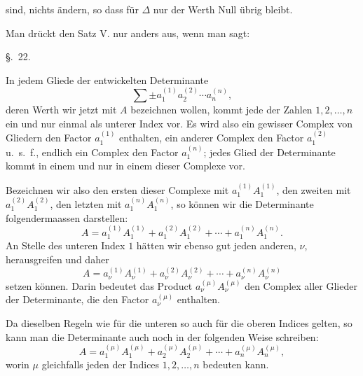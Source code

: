 
sind, nichts ändern, so dass für \(\Delta\) nur der Werth Null übrig bleibt.

Man drückt den Satz V. nur anders aus, wenn man sagt:


\begin{center}
{\large \S.\ 22.}

\vspace{0.5em}
{\large{}}
\end{center}

In jedem Gliede der entwickelten Determinante
\[
\sum \pm a_1^{(1)}a_2^{(2)}\cdots a_n^{(n)},
\]
deren Werth wir jetzt mit \(A\) bezeichnen wollen, kommt jede der Zahlen \(1,2,\ldots,n\) ein und nur einmal als unterer Index vor. Es wird also ein gewisser Complex von Gliedern den Factor \(a_1^{(1)}\) enthalten, ein anderer Complex den Factor \(a_1^{(2)}\) u.~s.~f., endlich ein Complex den Factor \(a_1^{(n)}\); jedes Glied der Determinante kommt in einem und nur in einem dieser Complexe vor.

Bezeichnen wir also den ersten dieser Complexe mit \(a_1^{(1)}A_1^{(1)}\), den zweiten mit \(a_1^{(2)}A_1^{(2)}\), den letzten mit \(a_1^{(n)}A_1^{(n)}\), so können wir die Determinante folgendermaassen darstellen:
\begin{equation}
A=a_1^{(1)}A_1^{(1)}+a_1^{(2)}A_1^{(2)}+\cdots+a_1^{(n)}A_1^{(n)}.
\tag{1}
\end{equation}
An Stelle des unteren Index \(1\) hätten wir ebenso gut jeden anderen, \(\nu\), herausgreifen und daher
\begin{equation}
A=a_\nu^{(1)}A_\nu^{(1)}+a_\nu^{(2)}A_\nu^{(2)}+\cdots+a_\nu^{(n)}A_\nu^{(n)}
\tag{2}
\end{equation}
setzen können. Darin bedeutet das Product \(a_\nu^{(\mu)}A_\nu^{(\mu)}\) den Complex aller Glieder der Determinante, die den Factor \(a_\nu^{(\mu)}\) enthalten.

Da dieselben Regeln wie für die unteren so auch für die oberen Indices gelten, so kann man die Determinante auch noch in der folgenden Weise schreiben:
\begin{equation}
A=a_1^{(\mu)}A_1^{(\mu)}+a_2^{(\mu)}A_2^{(\mu)}+\cdots+a_n^{(\mu)}A_n^{(\mu)},
\tag{3}
\end{equation}
worin \(\mu\) gleichfalls jeden der Indices \(1,2,\ldots,n\) bedeuten kann.
